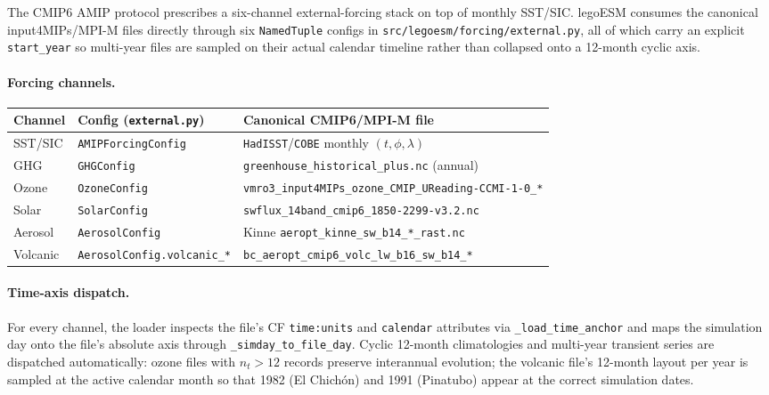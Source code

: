 \documentclass[11pt,twoside]{report}
\begin{document}
The CMIP6 AMIP protocol prescribes a six-channel external-forcing stack
on top of monthly SST/SIC.  legoESM consumes the canonical
input4MIPs/MPI-M files directly through six \texttt{NamedTuple} configs in
\texttt{src/legoesm/forcing/external.py}, all of which carry an explicit
\texttt{start\_year} so multi-year files are sampled on their actual
calendar timeline rather than collapsed onto a 12-month cyclic axis.

\paragraph{Forcing channels.}
\begin{center}
\begin{tabular}{lll}
\toprule
Channel & Config (\texttt{external.py}) & Canonical CMIP6/MPI-M file \\
\midrule
SST/SIC          & \texttt{AMIPForcingConfig}   & \texttt{HadISST}/\texttt{COBE} monthly $(t,\phi,\lambda)$ \\
GHG              & \texttt{GHGConfig}            & \texttt{greenhouse\_historical\_plus.nc} (annual) \\
Ozone            & \texttt{OzoneConfig}          & \texttt{vmro3\_input4MIPs\_ozone\_CMIP\_UReading-CCMI-1-0\_*} \\
Solar            & \texttt{SolarConfig}          & \texttt{swflux\_14band\_cmip6\_1850-2299-v3.2.nc} \\
Aerosol          & \texttt{AerosolConfig}        & Kinne \texttt{aeropt\_kinne\_sw\_b14\_*\_rast.nc} \\
Volcanic         & \texttt{AerosolConfig.volcanic\_*} & \texttt{bc\_aeropt\_cmip6\_volc\_lw\_b16\_sw\_b14\_*} \\
\bottomrule
\end{tabular}
\end{center}

\paragraph{Time-axis dispatch.}
For every channel, the loader inspects the file's CF \texttt{time:units}
and \texttt{calendar} attributes via \texttt{\_load\_time\_anchor} and
maps the simulation day onto the file's absolute axis through
\texttt{\_simday\_to\_file\_day}.  Cyclic 12-month climatologies and
multi-year transient series are dispatched automatically:
ozone files with $n_t > 12$ records preserve interannual evolution; the
volcanic file's 12-month layout per year is sampled at the active
calendar month so that 1982 (El Chich\'on) and 1991 (Pinatubo) appear
at the correct simulation dates.
\end{document}
